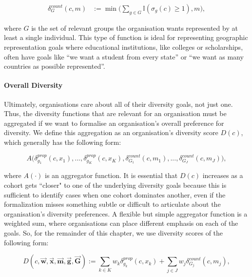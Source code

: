 \begin{equation} 
    \begin{split}
        \delta_G^{count}(c,m) &:= \min\big(\sum_{g \in G}\mathbb{I}(\sigma_g(c)\geq 1), m\big), \label{eq:count_div_function}
    \end{split}
\end{equation}

\noindent where $G$ is the set of relevant groups the organisation wants represented by at least a single individual. This type of function is ideal for representing geographic representation goals where educational institutions, like colleges or scholarships, often have goals like ``we want a student from every state'' or ``we want as many countries as possible represented''. 

\paragraph{Overall Diversity} Ultimately, organisations care about all of their diversity goals, not just one. Thus, the diversity functions that are relevant for an organisation must be aggregated if we want to formalise an organisation's overall preference for diversity. We define this aggregation as an organisation's diversity score $D(c)$, which generally has the following form: 

\begin{equation}
A\big(\delta_{g_1}^{prop}(c,x_1),...,\delta_{g_K}^{prop}(c,x_K),\delta_{G_1}^{count}(c, m_1),...,\delta_{G_J}^{count}(c, m_J)\big), \nonumber
\end{equation}

\noindent where $A(\cdot)$ is an aggregator function. It is essential that $D(c)$ increases as a cohort gets ``closer" to one of the underlying diversity goals because this is sufficient to identify cases when one cohort dominates another, even if the formalization misses something subtle or difficult to articulate about the organisation's diversity preferences. A flexible but simple aggregator function is a weighted sum, where organisations can place different emphasis on each of the goals. So, for the remainder of this chapter, we use diversity scores of the following form: 

\begin{equation}\label{eq:d_equation}
D(c,\vec{\mathbf{w}},\vec{\mathbf{x}},\vec{\mathbf{m}}, \vec{\mathbf{g}}, \vec{\mathbf{G}}) := \sum_{k\in K}w_k\delta_{g_k}^{prop}(c,x_k) + \sum_{j \in J}w_j\delta_{G_j}^{count}(c, m_j),
\end{equation}

